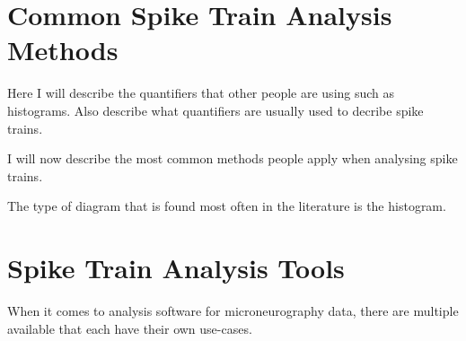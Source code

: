 \section{Common Spike Train Analysis Methods}
Here I will describe the quantifiers that other people are using such as histograms. Also describe what quantifiers are usually used to decribe spike trains.

I will now describe the most common methods people apply when analysing spike trains. 

The type of diagram that is found most often in the literature is the histogram.

\section{Spike Train Analysis Tools}
When it comes to analysis software for microneurography data,  there are multiple available that each have their own use-cases.

